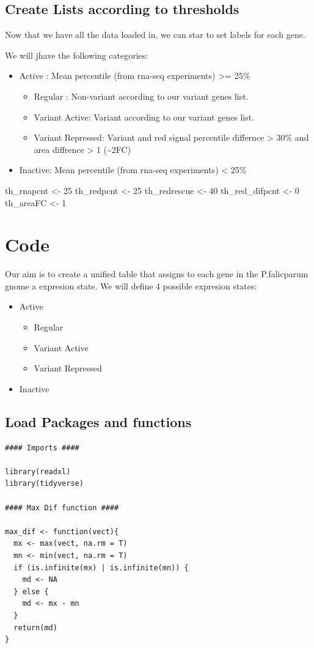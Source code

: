 \documentclass[11pt]{article}
\begin{document}
\subsection{Create Lists according to thresholds}
\label{sec:org619cff9}

Now that we have all the data loaded in, we can star to set labels for each gene.

We will jhave the following categories:
\begin{itemize}
\item Active : Mean percentile (from rna-seq experiments) >= 25\%
\begin{itemize}
\item Regular : Non-variant according to our variant genes list.
\item Variant Active: Variant according to our variant genes list.
\item Variant Repressed: Variant and red signal percentile differnce > 30\% and area diffrence > 1 (\textasciitilde{}2FC)
\end{itemize}

\item Inactive: Mean percentile (from rna-seq experiments) < 25\%
\end{itemize}

th\_rnapcnt <- 25
th\_redpcnt <- 25
th\_redrescue <- 40
th\_red\_difpcnt <- 0
th\_areaFC <- 1

\section{Code}
\label{sec:org586b077}
Our aim is to create a unified table that assigns to each gene in the P.falicparum gnome a expresion state.
We will define 4 possible expresion states:
\begin{itemize}
\item Active
\begin{itemize}
\item Regular
\item Variant Active
\item Variant Repressed
\end{itemize}
\item Inactive
\end{itemize}

\subsection{Load Packages and functions}
\label{sec:orgac7187e}
\begin{verbatim}
#### Imports ####

library(readxl)
library(tidyverse)

#### Max Dif function ####

max_dif <- function(vect){
  mx <- max(vect, na.rm = T)
  mn <- min(vect, na.rm = T)
  if (is.infinite(mx) | is.infinite(mn)) {
    md <- NA
  } else {
    md <- mx - mn
  }
  return(md)
}
\end{verbatim}
\end{document}
